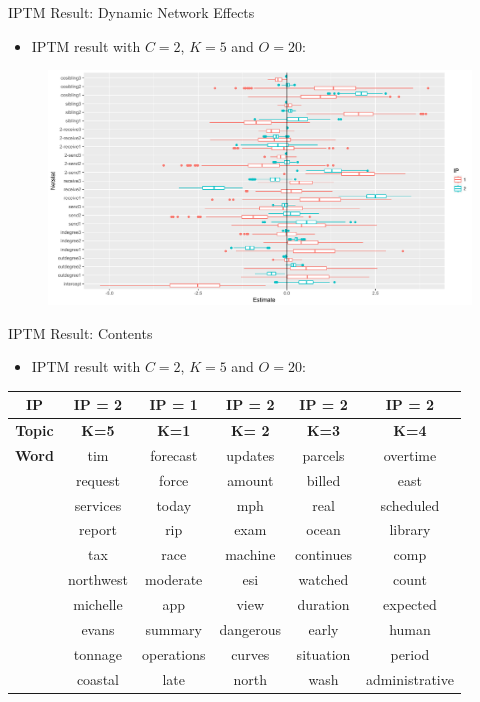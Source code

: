 \documentclass[10pt]{beamer}
\def\bni{\begin{itemize}} \def\ei{\end{itemize}}
\theoremstyle{definition}
\theoremstyle{remark}
\begin{document}
\begin{frame}{IPTM Result: Dynamic Network Effects}
	\bni \item IPTM result with $C=2$, $K=5$ and $O= 20$:
		\ei
  				 		 \begin{figure}
  				 		 	\includegraphics[width=1\textwidth]{figures/DareBplot.pdf}
  				 		 \end{figure}	
  				 		\end{frame}
 \begin{frame}{IPTM Result: Contents}
 	\bni \item IPTM result with $C=2$, $K=5$ and $O= 20$:
 	\ei
\centering	\begin{table}[ht]
	\centering
	\begin{tabular}{ |c|c|c|c|c|c|} 
		\hline
		\textbf{IP} & \textbf{IP = 2} &  \textbf{IP = 1} & \textbf{IP = 2}  &\textbf{IP = 2} &\textbf{IP = 2}  \\ \hline
			\textbf{Topic} & \textbf{K=5} &  \textbf{K=1} & \textbf{K= 2}  &\textbf{K=3} &\textbf{K=4}  \\ \hline
			\textbf{Word}& tim & forecast & updates & parcels &overtime\\
			& request& force & amount & billed & east \\
		 & services & today & mph & real & scheduled \\
		   & report & rip & exam & ocean & library\\
		   & tax & race & machine & continues & comp\\
		    &northwest & moderate & esi & watched & count \\
		    & michelle & app  &view & duration & expected \\
		      & evans & summary& dangerous & early & human\\
		 & tonnage & operations & curves & situation & period\\
		 & coastal & late & north & wash & administrative\\
			\hline
	\end{tabular}
\end{table}
\end{frame}
\end{document}
